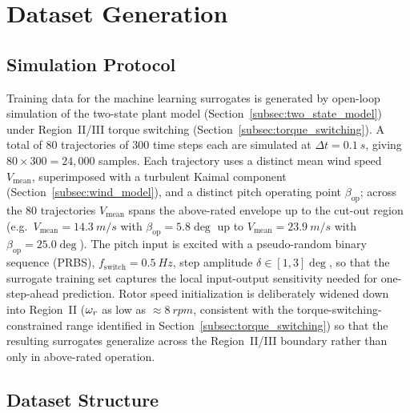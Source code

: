 
\section{Dataset Generation}
\label{sec:dataset_generation}

\subsection{Simulation Protocol}
\label{subsec:simulation_protocol}

Training data for the machine learning surrogates is generated by
open-loop simulation of the two-state plant model
(Section~\ref{subsec:two_state_model}) under Region~II/III torque
switching (Section~\ref{subsec:torque_switching}). A total of $80$
trajectories of $300$ time steps each are simulated at $\Delta t =
\SI{0.1}{s}$, giving $80 \times 300 = 24{,}000$ samples. Each trajectory
uses a distinct mean wind speed $V_{\text{mean}}$, superimposed with a
turbulent Kaimal component (Section~\ref{subsec:wind_model}), and a
distinct pitch operating point $\beta_{\text{op}}$; across the 80
trajectories $V_{\text{mean}}$ spans the above-rated envelope up to the
cut-out region (e.g.\ $V_{\text{mean}} = \SI{14.3}{m/s}$ with
$\beta_{\text{op}} = 5.8\deg$ up to $V_{\text{mean}} = \SI{23.9}{m/s}$ with
$\beta_{\text{op}} = 25.0\deg$). The pitch input is excited with a
pseudo-random binary sequence (PRBS), $f_{\text{switch}} = \SI{0.5}{Hz}$,
step amplitude $\delta \in [1,3]\deg$, so that the surrogate training set
captures the local input-output sensitivity needed for one-step-ahead
prediction. Rotor speed initialization is deliberately widened down into
Region~II ($\omega_r$ as low as $\approx\SI{8}{rpm}$, consistent with the
torque-switching-constrained range identified in
Section~\ref{subsec:torque_switching}) so that the resulting surrogates
generalize across the Region~II/III boundary rather than only in
above-rated operation.

\subsection{Dataset Structure}
\label{subsec:dataset_structure}

